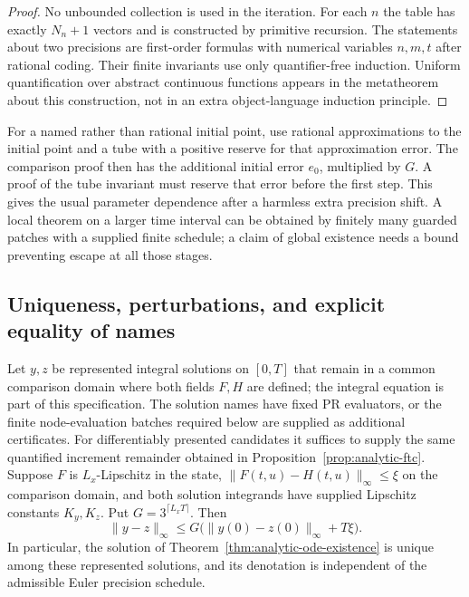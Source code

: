 \begin{proof}
No unbounded collection is used in the iteration.  For each $n$ the table has exactly $N_n+1$ vectors and is constructed by primitive recursion.  The statements about two precisions are first-order formulas with numerical variables $n,m,t$ after rational coding.  Their finite invariants use only quantifier-free induction.  Uniform quantification over abstract continuous functions appears in the metatheorem about this construction, not in an extra object-language induction principle.
\end{proof}

For a named rather than rational initial point, use rational approximations to the initial point and a tube with a positive reserve for that approximation error.  The comparison proof then has the additional initial error $e_0$, multiplied by $G$.  A proof of the tube invariant must reserve that error before the first step.  This gives the usual parameter dependence after a harmless extra precision shift.  A local theorem on a larger time interval can be obtained by finitely many guarded patches with a supplied finite schedule; a claim of global existence needs a bound preventing escape at all those stages.

\subsection{Uniqueness, perturbations, and explicit equality of names}

\begin{theorem}
\label{thm:analytic-ode-stability}
Let $y,z$ be represented integral solutions on $[0,T]$ that remain in a common comparison domain where both fields $F,H$ are defined; the integral equation is part of this specification.  The solution names have fixed PR evaluators, or the finite node-evaluation batches required below are supplied as additional certificates.  For differentiably presented candidates it suffices to supply the same quantified increment remainder obtained in Proposition~\ref{prop:analytic-ftc}.  Suppose $F$ is $L_x$-Lipschitz in the state, $\|F(t,u)-H(t,u)\|_\infty\le\xi$ on the comparison domain, and both solution integrands have supplied Lipschitz constants $K_y,K_z$.  Put $G=3^{\lceil L_xT\rceil}$.  Then
\begin{equation}
 \|y-z\|_\infty
 \le G\bigl(\|y(0)-z(0)\|_\infty+T\xi\bigr).
 \label{eq:analytic-ode-stability}
\end{equation}
In particular, the solution of Theorem~\ref{thm:analytic-ode-existence} is unique among these represented solutions, and its denotation is independent of the admissible Euler precision schedule.
\end{theorem}

